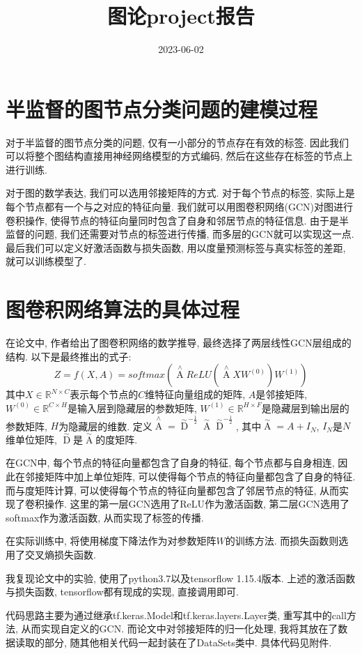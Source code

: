 \documentclass{article}
\title{图论project报告}
\date{2023-06-02}
\begin{document}
\maketitle
\section{半监督的图节点分类问题的建模过程}
对于半监督的图节点分类的问题, 仅有一小部分的节点存在有效的标签. 
因此我们可以将整个图结构直接用神经网络模型的方式编码, 然后在这些存在标签的节点上进行训练.

对于图的数学表达, 我们可以选用邻接矩阵的方式. 对于每个节点的标签, 实际上是每个节点都有一个与之对应的特征向量.
我们就可以用图卷积网络(GCN)对图进行卷积操作, 使得节点的特征向量同时包含了自身和邻居节点的特征信息.
由于是半监督的问题, 我们还需要对节点的标签进行传播, 而多层的GCN就可以实现这一点.
最后我们可以定义好激活函数与损失函数, 用以度量预测标签与真实标签的差距, 就可以训练模型了.
\section{图卷积网络算法的具体过程}
在论文中, 作者给出了图卷积网络的数学推导, 最终选择了两层线性GCN层组成的结构. 以下是最终推出的式子:
$$Z=f(X,A)=softmax(\mathop{A}\limits^{\wedge}ReLU(\mathop{A}\limits^{\wedge}XW^{(0)})W^{(1)})$$
其中$X\in \mathbb{R}^{N \times C}$表示每个节点的$C$维特征向量组成的矩阵, $A$是邻接矩阵, $W^{(0)}\in\mathbb{R}^{C \times H}$是输入层到隐藏层的参数矩阵, $W^{(1)}\in\mathbb{R}^{H \times F}$是隐藏层到输出层的参数矩阵, $H$为隐藏层的维数.
定义$\mathop{A}\limits^{\wedge}={\mathop{D}\limits^{\sim}}^{-\frac{1}{2}}\mathop{A}\limits^{\sim}{\mathop{D}\limits^{\sim}}^{-\frac{1}{2}}$,
其中$\mathop{A}\limits^{\sim}=A+I_N$, $I_N$是$N$维单位矩阵, $\mathop{D}\limits^{\sim}$是$\mathop{A}\limits^{\sim}$的度矩阵.

在GCN中, 每个节点的特征向量都包含了自身的特征, 每个节点都与自身相连, 因此在邻接矩阵中加上单位矩阵, 可以使得每个节点的特征向量都包含了自身的特征.
而与度矩阵计算, 可以使得每个节点的特征向量都包含了邻居节点的特征, 从而实现了卷积操作.
这里的第一层GCN选用了ReLU作为激活函数, 第二层GCN选用了softmax作为激活函数, 从而实现了标签的传播.

在实际训练中, 将使用梯度下降法作为对参数矩阵$W$的训练方法. 而损失函数则选用了交叉熵损失函数.

我复现论文中的实验, 使用了python3.7以及tensorflow 1.15.4版本.
上述的激活函数与损失函数, tensorflow都有现成的实现, 直接调用即可.

代码思路主要为通过继承tf.keras.Model和tf.keras.layers.Layer类, 重写其中的call方法, 从而实现自定义的GCN.
而论文中对邻接矩阵的归一化处理, 我将其放在了数据读取的部分, 随其他相关代码一起封装在了DataSets类中.
具体代码见附件.
\end{document}
